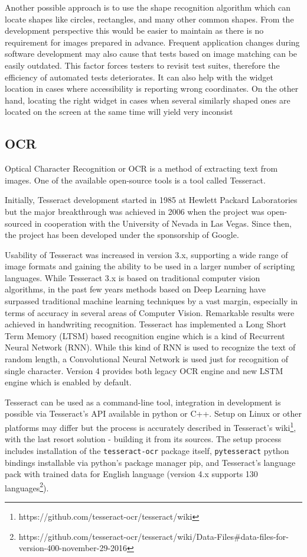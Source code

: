 Another possible approach is to use the shape recognition algorithm which can locate shapes like circles, rectangles, and many other common shapes. From the development perspective this would be easier to maintain as there is no requirement for images prepared in advance. Frequent application changes during software development may also cause that tests based on image matching can be easily outdated. This factor forces testers to revisit test suites, therefore the efficiency of automated tests deteriorates. It can also help with the widget location in cases where accessibility is reporting wrong coordinates. On the other hand, locating the right widget in cases when several similarly shaped ones are located on the screen at the same time will yield very inconsist


\subsection{OCR}\label{OCR_section}
Optical Character Recognition or OCR is a method of extracting text from images. One of the available open-source tools is a tool called Tesseract.

Initially, Tesseract development started in 1985 at Hewlett Packard Laboratories but the major breakthrough was achieved in 2006 when the project was open-sourced in cooperation with the University of Nevada in Las Vegas. Since then, the project has been developed under the sponsorship of Google\cite{tesseract_history}.

Usability of Tesseract was increased in version 3.x, supporting a wide range of image formats and gaining the ability to be used in a larger number of scripting languages. While Tesseract 3.x is based on traditional computer vision algorithms, in the past few years methods based on Deep Learning have surpassed traditional machine learning techniques by a vast margin, especially in terms of accuracy in several areas of Computer Vision. Remarkable results were achieved in handwriting recognition. Tesseract has implemented a Long Short Term Memory (LTSM) based recognition engine which is a kind of Recurrent Neural Network (RNN). While this kind of RNN is used to recognize the text of random length, a Convolutional Neural Network is used just for recognition of single character. Version 4 provides both legacy OCR engine and new LSTM engine which is enabled by default.\cite{tesseract}

Tesseract can be used as a command-line tool, integration in development is possible via Tesseract's API available in python or C++. Setup on Linux or other platforms may differ but the process is accurately described in Tesseract's wiki\footnote{https://github.com/tesseract-ocr/tesseract/wiki}, with the last resort solution - building it from its sources.
The setup process includes installation of the \texttt{tesseract-ocr} package itself, \texttt{pytesseract} python bindings installable via python's package manager pip, and Tesseract's language pack with trained data for English language (version 4.x supports 130 languages\footnote{https://github.com/tesseract-ocr/tesseract/wiki/Data-Files\#data-files-for-version-400-november-29-2016}). 

